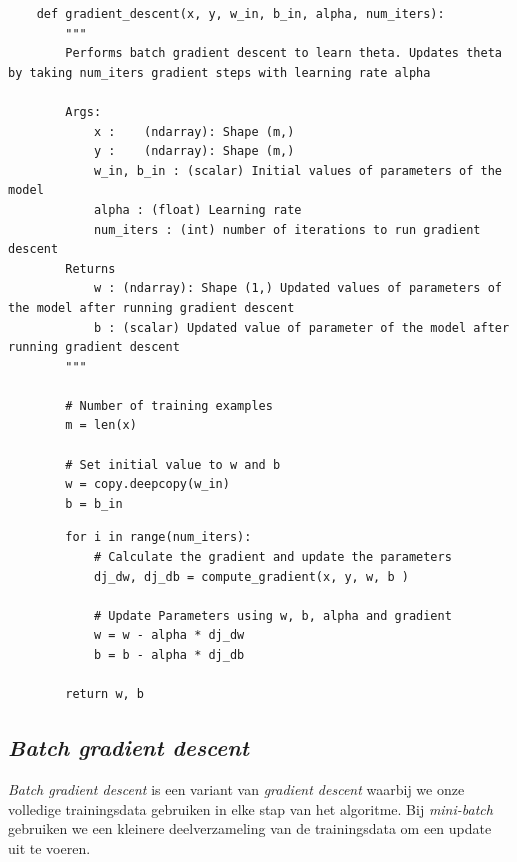 \begin{lstlisting}
	def gradient_descent(x, y, w_in, b_in, alpha, num_iters): 
	    """
	    Performs batch gradient descent to learn theta. Updates theta by taking num_iters gradient steps with learning rate alpha
	
	    Args:
	        x :    (ndarray): Shape (m,)
	        y :    (ndarray): Shape (m,)
	        w_in, b_in : (scalar) Initial values of parameters of the model
	        alpha : (float) Learning rate
	        num_iters : (int) number of iterations to run gradient descent
	    Returns
	        w : (ndarray): Shape (1,) Updated values of parameters of the model after running gradient descent
	        b : (scalar) Updated value of parameter of the model after running gradient descent
	    """
	
	    # Number of training examples
	    m = len(x)
	
	    # Set initial value to w and b
	    w = copy.deepcopy(w_in)
	    b = b_in
\end{lstlisting}
\newpage
\begin{lstlisting}	
	    for i in range(num_iters):
	        # Calculate the gradient and update the parameters
	        dj_dw, dj_db = compute_gradient(x, y, w, b )  
	
	        # Update Parameters using w, b, alpha and gradient
	        w = w - alpha * dj_dw               
	        b = b - alpha * dj_db               
	
	    return w, b
\end{lstlisting}

\subsection{\textit{Batch gradient descent}}

\textit{Batch gradient descent} is een variant van \textit{gradient descent} waarbij we onze volledige trainingsdata gebruiken in elke stap van het algoritme. Bij \textit{mini-batch} gebruiken we een kleinere deelverzameling van de trainingsdata om een update uit te voeren. 
